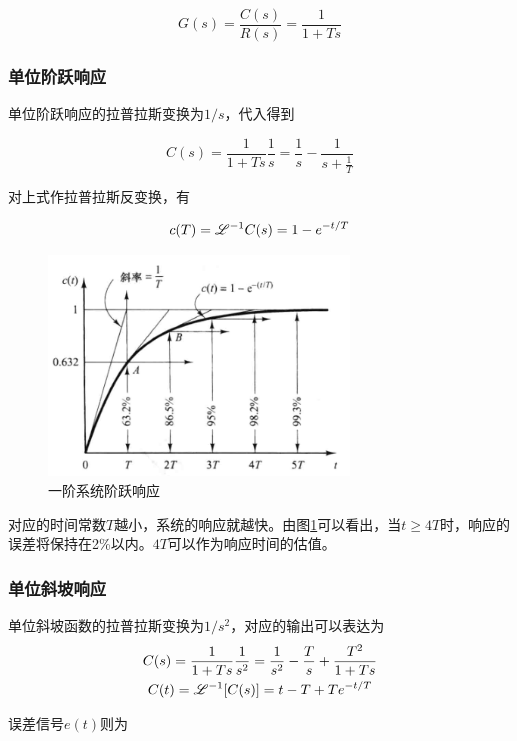 \begin{equation*}
G(s)=\frac{C(s)}{R(s)}=\frac{1}{1+Ts}
\end{equation*}

\subsubsection{单位阶跃响应}

单位阶跃响应的拉普拉斯变换为$1/s$，代入得到

\begin{equation*}
C(s)=\frac{1}{1+Ts}\frac{1}{s}=\frac{1}{s}-\frac{1}{s+\frac1T}
\end{equation*}

对上式作拉普拉斯反变换，有

\begin{equation*}
c(T)=\mathscr{L}^{-1}C(s)=1-e^{-{t}/{T}}
\end{equation*}

\begin{figure}[!ht]
	\centering
	\includegraphics[width=8cm]{figures/6.png}
	\caption{一阶系统阶跃响应}
	\label{6}
\end{figure}

对应的时间常数$T$越小，系统的响应就越快。由图\ref{6}可以看出，当$t\ge4T$时，响应的误差将保持在2\%以内。$4T$可以作为响应时间的估值。

\subsubsection{单位斜坡响应}

单位斜坡函数的拉普拉斯变换为$1/s^2$，对应的输出可以表达为
\begin{gather*}
C(s)=\frac{1}{1+Ts}\frac{1}{s^2}=\frac{1}{s^2}-\frac{T}{s}+\frac{T^2}{1+Ts}\\
C(t)=\mathscr{L}^{-1}[C(s)]=t-T+Te^{-t/T}
\end{gather*}

误差信号$e(t)$则为

